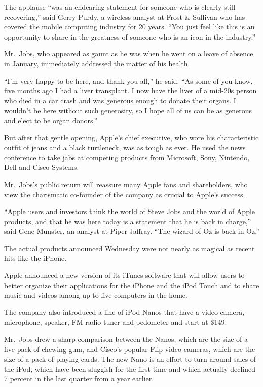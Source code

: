﻿\documentclass[12pt]{article}
\begin{document}
The applause ``was an endearing statement for someone who is clearly still recovering,'' said Gerry
Purdy, a wireless analyst at Frost \& Sullivan who has covered the mobile computing industry for 20
years. ``You just feel like this is an opportunity to share in the greatness of someone who is an
icon in the industry.''

Mr.~Jobs, who appeared as gaunt as he was when he went on a leave of absence in January, immediately
addressed the matter of his health.

``I'm very happy to be here, and thank you all,'' he said. ``As some of you know, five months ago I
had a liver transplant. I now have the liver of a mid-20s person who died in a car crash and was
generous enough to donate their organs. I wouldn't be here without such generosity, so I hope all of
us can be as generous and elect to be organ donors.''

But after that gentle opening, Apple's chief executive, who wore his characteristic outfit of jeans
and a black turtleneck, was as tough as ever. He used the news conference to take jabs at competing
products from Microsoft, Sony, Nintendo, Dell and Cisco Systems.

Mr.~Jobs's public return will reassure many Apple fans and shareholders, who view the charismatic
co-founder of the company as crucial to Apple's success.

``Apple users and investors think the world of Steve Jobs and the world of Apple products, and that
he was here today is a statement that he is back in charge,'' said Gene Munster, an analyst at Piper
Jaffray. ``The wizard of Oz is back in Oz.''

The actual products announced Wednesday were not nearly as magical as recent hits like the iPhone.

Apple announced a new version of its iTunes software that will allow users to better organize their
applications for the iPhone and the iPod Touch and to share music and videos among up to five
computers in the home.

The company also introduced a line of iPod Nanos that have a video camera, microphone, speaker, FM
radio tuner and pedometer and start at \$149.

Mr.~Jobs drew a sharp comparison between the Nanos, which are the size of a five-pack of chewing
gum, and Cisco's popular Flip video cameras, which are the size of a pack of playing cards. The new
Nano is an effort to turn around sales of the iPod, which have been sluggish for the first time and
which actually declined 7 percent in the last quarter from a year earlier.
\end{document}
